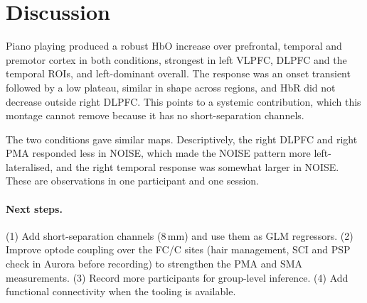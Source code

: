 \documentclass[11pt,a4paper]{article}
\begin{document}
\section{Discussion}
Piano playing produced a robust HbO increase over prefrontal, temporal and
premotor cortex in both conditions, strongest in left VLPFC, DLPFC and the
temporal ROIs, and left-dominant overall. The response was an onset transient
followed by a low plateau, similar in shape across regions, and HbR did not
decrease outside right DLPFC. This points to a systemic contribution, which
this montage cannot remove because it has no short-separation channels.

The two conditions gave similar maps. Descriptively, the right DLPFC and
right PMA responded less in NOISE, which made the NOISE pattern more
left-lateralised, and the right temporal response was somewhat larger in
NOISE. These are observations in one participant and one session.

\paragraph{Next steps.}
(1) Add short-separation channels (8\,mm) and use them as GLM regressors.
(2) Improve optode coupling over the FC/C sites (hair management, SCI and PSP
check in Aurora before recording) to strengthen the PMA and SMA measurements.
(3) Record more participants for group-level inference. (4) Add functional
connectivity when the tooling is available.
\end{document}

